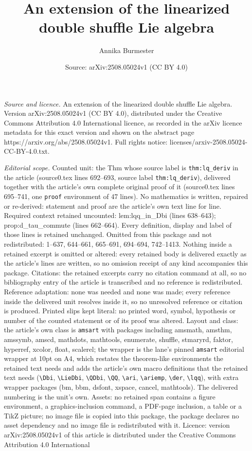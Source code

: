 \documentclass[10pt,a4paper]{amsart}
\title[An extension of the linearized double shuffle Lie algebra]{An extension of the linearized double shuffle Lie algebra}
\author{Annika Burmester}
\date{Source: arXiv:2508.05024v1 (CC BY 4.0)}
\begin{document}
\maketitle

\noindent\emph{Source and licence.} An extension of the linearized double shuffle Lie algebra. Version arXiv:2508.05024v1 (CC BY 4.0), distributed under the Creative Commons Attribution 4.0 International licence, as recorded in the arXiv licence metadata for this exact version and shown on the abstract page https://arxiv.org/abs/2508.05024v1. Full rights notice: licenses/arxiv-2508.05024-CC-BY-4.0.txt.\par\smallskip

\noindent\textit{Editorial scope.} Counted unit: the Thm whose source label is \texttt{thm:lq\_deriv} in the article (source0.tex lines 692--693, source label \texttt{thm:lq\_deriv}), delivered together with the article's own complete original proof of it (source0.tex lines 695--741, one \texttt{proof} environment of 47 lines). No mathematics is written, repaired or re-derived: statement and proof are the article's own text line for line. Required context retained uncounted: lem:lqq\_in\_Dbi (lines 638--643); prop:d\_tau\_commute (lines 662--664). Every definition, display and label of those lines is retained unchanged. Omitted from this package and not redistributed: 1--637, 644--661, 665--691, 694--694, 742--1413. Nothing inside a retained excerpt is omitted or altered: every retained body is delivered exactly as the article's lines are written, so no omission receipt of any kind accompanies this package. Citations: the retained excerpts carry no citation command at all, so no bibliography entry of the article is transcribed and no reference is redistributed. Reference adaptation: none was needed and none was made; every reference inside the delivered unit resolves inside it, so no unresolved reference or citation is produced. Printed slips kept literal: no printed word, symbol, hypothesis or number of the counted statement or of its proof was altered. Layout and class: the article's own class is \texttt{amsart} with packages including amsmath, amsthm, amssymb, amscd, mathdots, mathtools, enumerate, shuffle, stmaryrd, faktor, hyperref, xcolor, float, scalerel; the wrapper is the lane's pinned \texttt{amsart} editorial wrapper at 10pt on A4, which restates the theorem-like environments the retained text needs and adds the article's own macro definitions that the retained text needs (\texttt{\textbackslash Dbi}, \texttt{\textbackslash LieDbi}, \texttt{\textbackslash QDbi}, \texttt{\textbackslash QQ}, \texttt{\textbackslash ari}, \texttt{\textbackslash ariemp}, \texttt{\textbackslash der}, \texttt{\textbackslash lqq}), with extra wrapper packages (bm, bbm, dsfont, xspace, cancel, mathtools). The delivered numbering is the unit's own. Assets: no retained span contains a figure environment, a graphics-inclusion command, a PDF-page inclusion, a table or a TikZ picture; no image file is copied into this package, the package declares no asset dependency and no image file is redistributed with it. Licence: version arXiv:2508.05024v1 of this article is distributed under the Creative Commons Attribution 4.0 International 
\end{document}
